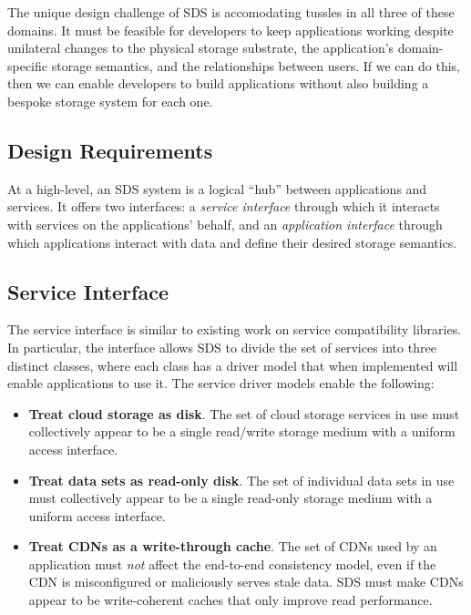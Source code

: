 The unique design challenge of SDS is accomodating tussles in all three of these
domains.  It must be feasible for developers to keep applications working
despite unilateral changes to the physical storage substrate, the application's
domain-specific storage semantics, and the relationships between users.  If we
can do this, then we can enable developers to build applications without also
building a bespoke storage system for each one.

\subsection{Design Requirements}

At a high-level, an SDS system is a logical ``hub'' between applications and
services.  It offers two interfaces:  a \emph{service interface} through which it interacts with
services on the applications' behalf, and an \emph{application interface} through
which applications interact with data and define their desired storage
semantics.

\subsection{Service Interface}

The service interface is similar to existing work on service compatibility
libraries.  In particular, the interface allows SDS to divide the set of
services into three distinct classes, where each class has a driver model that
when implemented will enable applications to use it.  The service driver models
enable the following:

\begin{itemize}
   \item \textbf{Treat cloud storage as disk}.  The set of cloud storage
      services in use must collectively appear to be a single
      read/write storage medium with a uniform access interface.
   \item \textbf{Treat data sets as read-only disk}.  The set of individual
      data sets in use must collectively appear to be a single read-only
      storage medium with a uniform access interface.
   \item \textbf{Treat CDNs as a write-through cache}.  The set of CDNs used by an
      application must \emph{not} affect the end-to-end consistency model, even if the
      CDN is misconfigured or maliciously serves stale data.  SDS must make CDNs
      appear to be write-coherent caches that only improve read performance.
\end{itemize}

